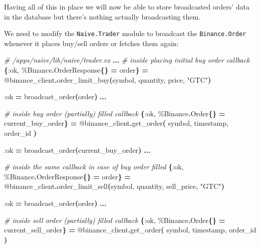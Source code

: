 \documentclass[
  oneside]{book}
\newenvironment{Shaded}{\begin{snugshade}}{\end{snugshade}}
\newcommand{\CommentTok}[1]{\textcolor[rgb]{0.56,0.35,0.01}{\textit{#1}}}
\newcommand{\ConstantTok}[1]{\textcolor[rgb]{0.56,0.35,0.01}{#1}}
\newcommand{\FunctionTok}[1]{\textcolor[rgb]{0.13,0.29,0.53}{\textbf{#1}}}
\newcommand{\NormalTok}[1]{#1}
\newcommand{\OperatorTok}[1]{\textcolor[rgb]{0.81,0.36,0.00}{\textbf{#1}}}
\newcommand{\OtherTok}[1]{\textcolor[rgb]{0.56,0.35,0.01}{#1}}
\newcommand{\StringTok}[1]{\textcolor[rgb]{0.31,0.60,0.02}{#1}}
\newcommand{\VariableTok}[1]{\textcolor[rgb]{0.00,0.00,0.00}{#1}}
\begin{document}
Having all of this in place we will now be able to store broadcasted orders' data in the database but there's nothing actually broadcasting them.

We need to modify the \texttt{Naive.Trader} module to broadcast the \texttt{Binance.Order} whenever it places buy/sell orders or fetches them again:

\begin{Shaded}
\begin{Highlighting}[]
    \CommentTok{\# /apps/naive/lib/naive/trader.ex}
    \OperatorTok{...}
    \CommentTok{\# inside placing initial buy order callback}
    \FunctionTok{\{}\VariableTok{:ok}\NormalTok{, \%}\ConstantTok{Binance}\OperatorTok{.}\ConstantTok{OrderResponse}\FunctionTok{\{\}} \OperatorTok{=}\NormalTok{ order}\FunctionTok{\}} \OperatorTok{=}
      \OtherTok{@binance\_client}\OperatorTok{.}\NormalTok{order\_limit\_buy}\FunctionTok{(}\NormalTok{symbol, quantity, price, }\StringTok{"GTC"}\FunctionTok{)}

    \VariableTok{:ok} \OperatorTok{=}\NormalTok{ broadcast\_order}\FunctionTok{(}\NormalTok{order}\FunctionTok{)}
    \OperatorTok{...}

    \CommentTok{\# inside buy order (partially) filled callback}
    \FunctionTok{\{}\VariableTok{:ok}\NormalTok{, \%}\ConstantTok{Binance}\OperatorTok{.}\ConstantTok{Order}\FunctionTok{\{\}} \OperatorTok{=}\NormalTok{ current\_buy\_order}\FunctionTok{\}} \OperatorTok{=}
      \OtherTok{@binance\_client}\OperatorTok{.}\NormalTok{get\_order}\FunctionTok{(}
\NormalTok{        symbol,}
\NormalTok{        timestamp,}
\NormalTok{        order\_id}
      \FunctionTok{)}

    \VariableTok{:ok} \OperatorTok{=}\NormalTok{ broadcast\_order}\FunctionTok{(}\NormalTok{current\_buy\_order}\FunctionTok{)}
    \OperatorTok{...}

        \CommentTok{\# inside the same callback in case of buy order filled}
        \FunctionTok{\{}\VariableTok{:ok}\NormalTok{, \%}\ConstantTok{Binance}\OperatorTok{.}\ConstantTok{OrderResponse}\FunctionTok{\{\}} \OperatorTok{=}\NormalTok{ order}\FunctionTok{\}} \OperatorTok{=}
          \OtherTok{@binance\_client}\OperatorTok{.}\NormalTok{order\_limit\_sell}\FunctionTok{(}\NormalTok{symbol, quantity, sell\_price, }\StringTok{"GTC"}\FunctionTok{)}
        
        \VariableTok{:ok} \OperatorTok{=}\NormalTok{ broadcast\_order}\FunctionTok{(}\NormalTok{order}\FunctionTok{)}
    \OperatorTok{...}

    \CommentTok{\# inside sell order (partially) filled callback}
    \FunctionTok{\{}\VariableTok{:ok}\NormalTok{, \%}\ConstantTok{Binance}\OperatorTok{.}\ConstantTok{Order}\FunctionTok{\{\}} \OperatorTok{=}\NormalTok{ current\_sell\_order}\FunctionTok{\}} \OperatorTok{=}
      \OtherTok{@binance\_client}\OperatorTok{.}\NormalTok{get\_order}\FunctionTok{(}
\NormalTok{        symbol,}
\NormalTok{        timestamp,}
\NormalTok{        order\_id}
      \FunctionTok{)}
    

\end{Highlighting}
\end{Shaded}
\end{document}
